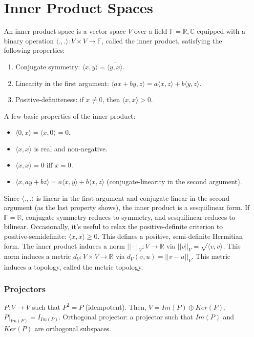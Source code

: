 \chapter{Inner Product Spaces}
An inner product space is a vector space $V$ over a field $\mathbb{F}=\mathbb{R},\mathbb{C}$ equipped with a binary operation $\langle ., .\rangle: V\times V\rightarrow \mathbb{F}$, called the inner product, satisfying the following properties:
\begin{enumerate}
	\item Conjugate symmetry: $\langle x, y\rangle = \overline{\langle y, x\rangle}$.
	\item Linearity in the first argument: $\langle ax + by, z\rangle = a\langle x, z\rangle + b\langle y, z\rangle$.
	\item Positive-definiteness: if $x \ne 0$, then $\langle x, x\rangle > 0$. 
\end{enumerate}
A few basic properties of the inner product:
\begin{itemize}
	\item $\langle 0, x\rangle = \langle x, 0\rangle = 0.$
	\item $\langle x, x\rangle$ is real and non-negative.
	\item $\langle x, x\rangle = 0$ iff $x=0$.
	\item $\langle x, ay + bz\rangle = \overline{a}\langle x, y\rangle +\overline{b}\langle x, z\rangle$ (conjugate-linearity in the second argument).
\end{itemize}
Since $\langle ., .\rangle$ is linear in the first argument and conjugate-linear in the second argument (as the last property shows), the inner product is a sesquilinear form. If $\mathbb{F}=\mathbb{R}$, conjugate symmetry reduces to symmetry, and sesquilinear reduces to bilinear. Occasionally, it's useful to relax the positive-definite criterion to positive-semidefinite: $\langle x, x\rangle \ge 0$. This defines a positive, semi-definite Hermitian form. The inner product induces a norm $||\cdot||_V: V\rightarrow \mathbb{R}$ via $||v||_V = \sqrt{\langle v, v\rangle }$. This norm induces a metric $d_V: V\times V\rightarrow \mathbb{R}$ via $d_V(v, u) = ||v - u ||_V$. This metric induces a topology, called the metric topology.
\subsection{Projectors}
$P: V\rightarrow V$ such that $P^2=P$ (idempotent). Then, $V=Im(P) \oplus Ker(P)$, $P|_{Im(P)} = I_{Im(P)}$. Orthogonal projector: a projector such that $Im(P)$ and $Ker(P)$ are orthogonal subspaces.
